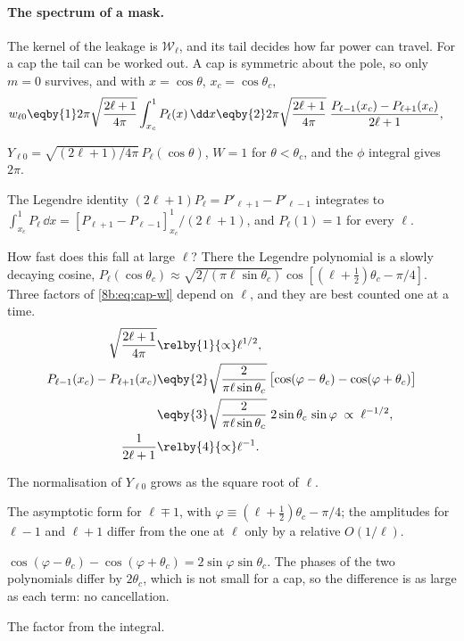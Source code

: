 \paragraph{The spectrum of a mask.}
The kernel of the leakage is $\mathcal W_\ell$, and its tail decides how far power can travel.
For a cap the tail can be worked out. A cap is symmetric about the pole, so only $m=0$
survives, and with $x=\cos\theta$, $x_c=\cos\theta_c$,
\begin{align}
  w_{\ell0}
  &\eqby{1}2\pi\sqrt{\frac{2\ell+1}{4\pi}}\int_{x_c}^{1}P_\ell(x)\,\dd x
   \eqby{2}2\pi\sqrt{\frac{2\ell+1}{4\pi}}\;
     \frac{P_{\ell-1}(x_c)-P_{\ell+1}(x_c)}{2\ell+1},
  \label{8b:eq:cap-wl}
\end{align}
\begin{explain}
  \item $Y_{\ell0}=\sqrt{(2\ell+1)/4\pi}\,P_\ell(\cos\theta)$, $W=1$ for $\theta<\theta_c$, and the $\phi$
        integral gives $2\pi$.
  \item The Legendre identity $(2\ell+1)P_\ell=P'_{\ell+1}-P'_{\ell-1}$ integrates to
        $\int_{x_c}^1P_\ell\,\dd x=[P_{\ell+1}-P_{\ell-1}]_{x_c}^1/(2\ell+1)$, and $P_\ell(1)=1$ for every $\ell$.
\end{explain}
How fast does this fall at large $\ell$? There the Legendre polynomial is a slowly decaying cosine,
$P_\ell(\cos\theta_c)\approx\sqrt{2/(\pi\ell\sin\theta_c)}\cos[(\ell+\tfrac12)\theta_c-\pi/4]$. Three factors of
\eqref{8b:eq:cap-wl} depend on $\ell$, and they are best counted one at a time.
\begin{align*}
  \sqrt{\frac{2\ell+1}{4\pi}}&\relby{1}{\propto}\ell^{1/2},\\
  P_{\ell-1}(x_c)-P_{\ell+1}(x_c)
  &\eqby{2}\sqrt{\frac2{\pi\ell\sin\theta_c}}\,\bigl[\cos(\varphi-\theta_c)-\cos(\varphi+\theta_c)\bigr]\\
  &\eqby{3}\sqrt{\frac2{\pi\ell\sin\theta_c}}\;2\sin\theta_c\,\sin\varphi\;\propto\;\ell^{-1/2},\\
  \frac1{2\ell+1}&\relby{4}{\propto}\ell^{-1}.
\end{align*}
\begin{explain}
  \item The normalisation of $Y_{\ell0}$ grows as the square root of $\ell$.
  \item The asymptotic form for $\ell\mp1$, with $\varphi\equiv(\ell+\tfrac12)\theta_c-\pi/4$; the amplitudes for
        $\ell-1$ and $\ell+1$ differ from the one at $\ell$ only by a relative $O(1/\ell)$.
  \item $\cos(\varphi-\theta_c)-\cos(\varphi+\theta_c)=2\sin\varphi\sin\theta_c$. The phases of the two
        polynomials differ by $2\theta_c$, which is not small for a cap, so the difference is as large as
        each term: no cancellation.
  \item The factor from the integral.
\end{explain}
